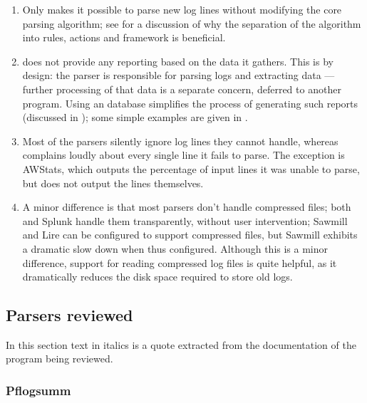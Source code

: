 \begin{enumerate}

    \item Only \parsername{} makes it possible to parse new log lines
        without modifying the core parsing algorithm; see  for a discussion of why the
        separation of the algorithm into rules, actions and framework is
        beneficial.

    \item \parsername{} does not provide any reporting based on the data it
        gathers.  This is by design: the parser is responsible for parsing
        logs and extracting data --- further processing of that data is a
        separate concern, deferred to another program.  Using an \SQL{}
        database simplifies the process of generating such reports
        (discussed in ); some
        simple examples are given in .

    \item Most of the parsers silently ignore log lines they cannot handle,
        whereas \parsername{} complains loudly about every single line it
        fails to parse.  The exception is AWStats, which outputs the
        percentage of input lines it was unable to parse, but does not
        output the lines themselves.

    \item A minor difference is that most parsers don't handle compressed
        files; both \parsername{} and Splunk handle them transparently,
        without user intervention; Sawmill and Lire can be configured to
        support compressed files, but Sawmill exhibits a dramatic slow down
        when thus configured.  Although this is a minor difference, support
        for reading compressed log files is quite helpful, as it
        dramatically reduces the disk space required to store old logs.

\end{enumerate}

\subsection{Parsers reviewed}

In this section text in italics is a quote extracted from the documentation
of the program being reviewed.


\subsubsection{Pflogsumm}

